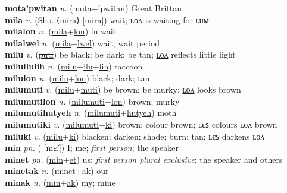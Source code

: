\textbf{mota'pwitan} \textit{n.} (\hyperref[mota]{mota}+\hyperref['pwitan]{'pwitan})
Great Brittan \label{mota'pwitan} \\
\textbf{mila} \textit{v.} (Sho. ⟨mira⟩ [mira])
wait; \hyperref[milalon]{ʟᴏᴧ} is waiting for ʟᴜᴍ \label{mila} \\
\textbf{milalon} \textit{n.} (\hyperref[mila]{mila}+\hyperref[lon]{lon})
in wait \label{milalon} \\
\textbf{milalwel} \textit{n.} (\hyperref[mila]{mila}+\hyperref[lwel]{lwel})
wait; wait period \label{milalwel} \\
\textbf{milu} \textit{v.} (\hyperref[puti]{\sout{puti}})
be black; be dark; be tan; \hyperref[milulon]{ʟᴏᴧ} reflects little light \label{milu} \\
\textbf{miluilulih} \textit{n.} (\hyperref[milu]{milu}+\hyperref[ilu]{ilu}+\hyperref[lih]{lih})
raccoon \label{miluilulih} \\
\textbf{milulon} \textit{n.} (\hyperref[milu]{milu}+\hyperref[lon]{lon})
black; dark; tan \label{milulon} \\
\textbf{milumuti} \textit{v.} (\hyperref[milu]{milu}+\hyperref[muti]{muti})
be brown; be murky; \hyperref[milumutilon]{ʟᴏᴧ} looks brown \label{milumuti} \\
\textbf{milumutilon} \textit{n.} (\hyperref[milumuti]{milumuti}+\hyperref[lon]{lon})
brown; murky \label{milumutilon} \\
\textbf{milumutihutyeh} \textit{n.} (\hyperref[milumuti]{milumuti}+\hyperref[hutyeh]{hutyeh})
moth \label{milumutihutyeh} \\
\textbf{milumutiki} \textit{v.} (\hyperref[milumuti]{milumuti}+\hyperref[ki]{ki})
brown; colour brown; ʟєꜱ colours ʟᴏᴧ brown \label{milumutiki} \\
\textbf{miluki} \textit{v.} (\hyperref[milu]{milu}+\hyperref[ki]{ki})
blacken; darken; shade; burn; tan; ʟєꜱ darkens ʟᴏᴧ \label{miluki} \\
\textbf{min} \textit{pn.} ( [mɛ̃ː])
I; me; \textit{first person}; the speaker \label{min} \\
\textbf{minet} \textit{pn.} (\hyperref[min]{min}+\hyperref[et]{et})
us; \textit{first person plural exclusive}; the speaker and others \label{minet} \\
\textbf{minetak} \textit{n.} (\hyperref[minet]{minet}+\hyperref[ak]{ak})
our \label{minetak} \\
\textbf{minak} \textit{n.} (\hyperref[min]{min}+\hyperref[ak]{ak})
my; mine \label{minak} \\
